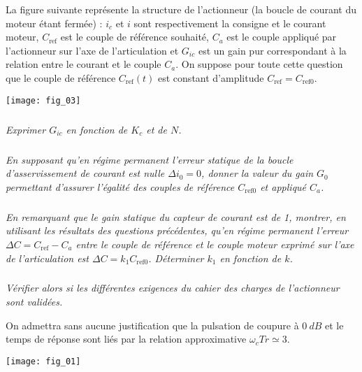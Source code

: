 \begin{multicols}{2}
La figure suivante représente la structure de l’actionneur (la boucle de courant du moteur étant fermée) : $i_c$ et $i$
sont respectivement la consigne et le courant moteur, $C_{\text{ref}}$ est le couple de référence souhaité, $C_a$ est le couple
appliqué par l’actionneur sur l’axe de l’articulation et $G_{ic}$ est un gain pur correspondant à la relation entre le
courant et le couple $C_a$. On suppose pour toute cette question que le couple de référence $C_{\text{ref}} (t)$ est constant
d’amplitude $C_{\text{ref}} = C_{\text{ref0}}$.


\begin{center}
\texttt{[image: fig\_03]}
\end{center}

\subparagraph{}\textit{Exprimer $G_{ic}$ en fonction de $K_c$ et de $N$.
}
\ifprof
\begin{corrige}
\end{corrige}
\else
\fi


\subparagraph{}\textit{
En supposant qu’en régime permanent l’erreur statique de la boucle d’asservissement de courant est nulle
$\Delta i_0= 0$, donner la valeur du gain $G_0$ permettant d’assurer l’égalité des couples de référence $C_{\text{ref0}}$ et appliqué $C_a$.}
\ifprof
\begin{corrige}
\end{corrige}
\else
\fi

\subparagraph{}\textit{
En remarquant que le gain statique du capteur de courant est de 1, montrer, en utilisant les résultats des questions précédentes, qu’en régime permanent l’erreur $\Delta C= C_{\text{ref}} -C_a$
entre le couple de référence et le couple moteur exprimé sur l’axe de l’articulation est $\Delta C= k_1C_{\text{ref0}}$. Déterminer $k_1$ en fonction de $k$.}
\ifprof
\begin{corrige}
\end{corrige}
\else
\fi


\subparagraph{}\textit{Vérifier alors si les différentes exigences du cahier des charges de l’actionneur sont validées.
}
\ifprof
\begin{corrige}
\end{corrige}
\else
\fi

On admettra sans aucune justification que la pulsation de coupure à $\SI{0}{dB}$ et le temps de réponse sont liés par la relation approximative $\omega_cTr \simeq 3$.

\end{multicols}


\begin{center}
\texttt{[image: fig\_01]}
\end{center}
%
%
%
%